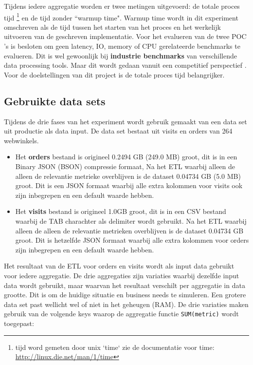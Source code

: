 Tijdens iedere aggregatie worden er twee metingen uitgevoerd: de totale proces tijd \footnote{tijd word gemeten door unix `time` zie de documentatie voor time: \url{http://linux.die.net/man/1/time}} en de  tijd zonder ``warmup time".  Warmup time wordt in dit experiment omschreven als de tijd tussen het starten van het proces en het werkelijk uitvoeren van de geschreven implementatie. Voor het evalueren van de twee POC 's is besloten om geen latency, IO, memory of CPU gerelateerde benchmarks te evalueren. Dit is wel gewoonlijk bij \textbf{industrie benchmarks} van verschillende data processing tools. Maar dit wordt gedaan vanuit een competitief perspectief  \parencite{ousterhout2015making}. Voor de doelstellingen van dit project is de totale proces tijd belangrijker.

\subsection{Gebruikte data sets}

Tijdens de drie fases van het experiment wordt gebruik gemaakt van een data set uit productie als data input. De data set bestaat uit visits en orders van 264 webwinkels.

\begin{itemize}
    \item Het \textbf{orders} bestand is origineel 0.2494 GB (249.0 MB) groot, dit is in een Binary JSON (BSON) compressie formaat, Na het ETL waarbij alleen de alleen de relevantie metrieke overblijven is de dataset 0.04734 GB (5.0 MB) groot. Dit is een JSON formaat waarbij alle extra kolommen voor visits ook zijn inbegrepen en een default waarde hebben.

    \item Het \textbf{visits} bestand is origineel 1.0GB groot, dit is in een CSV bestand waarbij de TAB charachter als delimiter wordt gebruikt.  Na het ETL waarbij alleen de alleen de relevantie metrieken overblijven is de dataset 0.04734 GB groot. Dit is hetzelfde JSON formaat waarbij alle extra kolommen voor orders zijn inbegrepen en een default waarde hebben.
\end{itemize}

Het resultaat van de ETL voor orders en visits wordt als input data gebruikt voor iedere aggregatie. De drie aggregaties zijn variaties waarbij dezelfde input data wordt gebruikt, maar waarvan het resultaat verschilt per aggregatie in data grootte. Dit is om de huidige situatie en business needs te simuleren. Een grotere data set past wellicht wel of niet in het geheugen (RAM). De drie variaties maken gebruik van de volgende keys waarop de aggregatie functie \verb=SUM(metric)= wordt toegepast:

